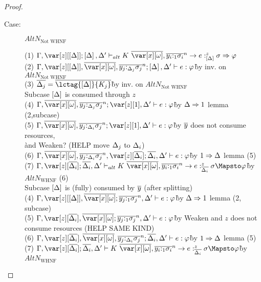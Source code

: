 \begin{proof}
\begin{description}
\item[Case:] $AltN_{\textrm{Not WHNF}}$
\begin{tabbing}
    (1) $\G, \z[\irr{\D}]; \irr{\D}, \D' \vdash_{alt} K~\ov{\xo},\ov{y_i{:}_{1}\s_i}^n\to e :^z_{\irr{\D}} \s \Rightarrow \vp$\\
    (2) $\G,\z[\irr{\D}],\ov{\xo},\ov{y_j{:}_{\D_j}\s_j}^n; \irr{\D}, \D' \vdash e : \vp$\`by inv. on $AltN_{\textrm{Not WHNF}}$\\
    (3) $\ov{\D_j} = \ov{\lctag{\irr{\D}}{K_j}}$\`by inv. on $AltN_{\textrm{Not WHNF}}$\\
    Subcase $\left[\Delta\right]$ is consumed through $z$\\
    (4) $\G,\ov{\xo},\ov{y_j{:}_{\D_j}\s_j}^n; \z[1], \D' \vdash e : \vp$\`by $\Delta \Rightarrow 1$ lemma (2,subcase)\\
    (5) $\G,\ov{\xo},\ov{y_j{:}_{\D_i}\s_j}^n; \z[1], \D' \vdash e : \vp$\`by $\overline{y}$ does not consume resources,\\\` and Weaken? (HELP move $\Delta_j$ to $\Delta_i$)\\
    (6) $\G,\ov{\xo},\ov{y_j{:}_{\D_i}\s_j}^n, \z[\ov{\D_i}]; \ov{\D_i}, \D' \vdash e : \vp$\`by $1 \Rightarrow \Delta$ lemma (5)\\
    (7) $\G, \z[\ov{\D_i}]; \ov{\D_i}, \D' \vdash_{alt} K~\ov{\xo},\ov{y_i{:}_{1}\s_i}^n \to e :^z_{\ov{\D_i}} \s \Mapsto \vp$\`by $AltN_{\textrm{WHNF}}$ (6)\\
    Subcase $\left[\Delta\right]$ is (fully) consumed by $\overline{y}$ (after splitting)\\
    (4) $\G,\z[\irr{\D}],\ov{\xo};\ov{y_j{:}_{1}\s_j}^n, \D' \vdash e : \vp$\`by $\Delta \Rightarrow 1$ lemma (2, subcase)\\
    (5) $\G,\z[\ov{\D_i}],\ov{\xo};\ov{y_j{:}_{1}\s_j}^n, \D' \vdash e : \vp$\`by Weaken and $z$ does not consume resources (HELP SAME KIND)\\
    (6) $\G,\z[\ov{\D_i}],\ov{\xo},\ov{y_j{:}_{\D_i}\s_j}^n; \ov{\D_i}, \D' \vdash e : \vp$\`by $1 \Rightarrow \Delta$ lemma (5)\\
    (7) $\G,\z[\ov{\D_i}]; \ov{\D_i}, \D' \vdash K~\ov{\xo},\ov{y_i{:}_{1}\s_i}^n\to e :^z_{\ov{\D_i}} \s \Mapsto \vp$\`by $AltN_{\textrm{WHNF}}$\\
\end{tabbing}

\end{description}
\end{proof}

